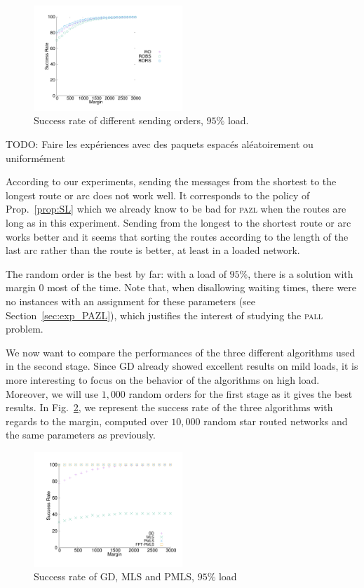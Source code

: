 \documentclass[10pt, conference, letterpaper]{IEEEtran}
\newcommand{\todo}[1]{{\color{red} TODO: {#1}}}
\newcommand\pazl{\textsc{pazl}\xspace}
\newcommand\pall{\textsc{pall}\xspace}
\begin{document}
\begin{figure}[h] 
  \centering
    \includegraphics[width=0.5\textwidth]{departs_gp_21000.pdf}
      \caption{Success rate of different sending orders, $95\%$ load.}
      \label{fig:success95}
          \end{figure}

     \todo{Faire les expériences avec des paquets espacés aléatoirement ou uniformément}
     
     According to our experiments, sending the messages from the shortest to the longest route or arc does not work well. It corresponds to the policy of Prop.~\ref{prop:SL} which we already know to be bad for \pazl when the routes are long as in this experiment. Sending from the longest to the shortest route or arc works better and it seems that sorting the routes according to the length of the last arc rather than the route is better, at least in a loaded network. 
     
     The random order is the best by far: with a load of $95\%$, there is a solution with margin $0$ most of the time. Note that, when disallowing waiting times, there were no instances with an assignment for these parameters (see Section~\ref{sec:exp_PAZL}), which justifies the interest of studying the \pall problem.
     
      We now want to compare the performances of the three different algorithms used in the second stage. Since GD already showed excellent results on mild loads, it is more interesting to focus on the behavior of the algorithms on high load. Moreover, we will use $1,000$ random orders for the first stage as it gives the best results. In Fig.~\ref{fig:success21000}, we represent the success rate of the three algorithms with regards to the margin,  computed over $10,000$ random star routed networks and the same parameters as previously.
     
    \begin{figure} [h] 
       \begin{center}
      \includegraphics[width=0.5\textwidth]{retour_21000.pdf}
      \end{center}
      \caption{Success rate of GD, MLS and PMLS, $95\%$ load}
     \label{fig:success21000}
     \end{figure}
     
\end{document}
